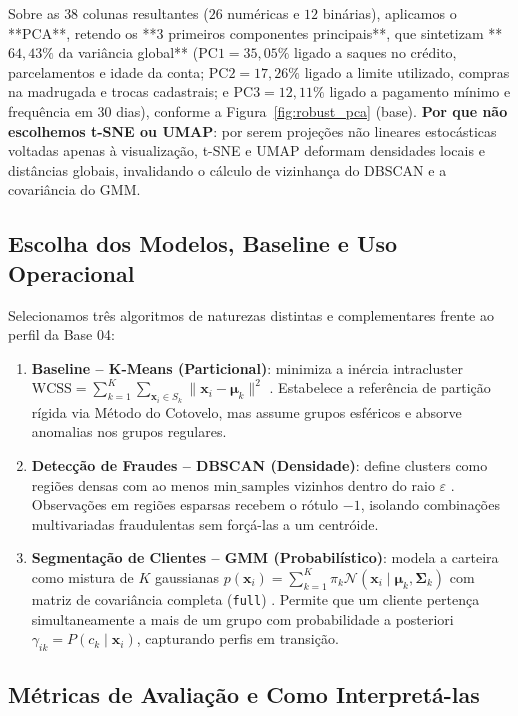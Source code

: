 \documentclass[10pt,twocolumn]{article}
\begin{document}
Sobre as $38$ colunas resultantes ($26$ numéricas e $12$ binárias), aplicamos o **PCA**, retendo os **$3$ primeiros componentes principais**, que sintetizam **$64,43\%$ da variância global** ($\text{PC1} = 35,05\%$ ligado a saques no crédito, parcelamentos e idade da conta; $\text{PC2} = 17,26\%$ ligado a limite utilizado, compras na madrugada e trocas cadastrais; e $\text{PC3} = 12,11\%$ ligado a pagamento mínimo e frequência em $30$ dias), conforme a Figura~\ref{fig:robust_pca} (base). \textbf{Por que não escolhemos t-SNE ou UMAP}: por serem projeções não lineares estocásticas voltadas apenas à visualização, t-SNE e UMAP deformam densidades locais e distâncias globais, invalidando o cálculo de vizinhança do DBSCAN e a covariância do GMM.

\subsection{Escolha dos Modelos, Baseline e Uso Operacional}

Selecionamos três algoritmos de naturezas distintas e complementares frente ao perfil da Base 04:
\begin{enumerate}
  \item \textbf{Baseline -- K-Means (Particional)}: minimiza a inércia intracluster $\text{WCSS} = \sum_{k=1}^{K}\sum_{\mathbf{x}_i \in S_k}\|\mathbf{x}_i - \boldsymbol{\mu}_k\|^2$ \cite{macqueen1967}. Estabelece a referência de partição rígida via Método do Cotovelo, mas assume grupos esféricos e absorve anomalias nos grupos regulares.
  \item \textbf{Detecção de Fraudes -- DBSCAN (Densidade)}: define clusters como regiões densas com ao menos $\text{min\_samples}$ vizinhos dentro do raio $\varepsilon$ \cite{ester1996}. Observações em regiões esparsas recebem o rótulo $-1$, isolando combinações multivariadas fraudulentas sem forçá-las a um centróide.
  \item \textbf{Segmentação de Clientes -- GMM (Probabilístico)}: modela a carteira como mistura de $K$ gaussianas $p(\mathbf{x}_i) = \sum_{k=1}^{K}\pi_k \mathcal{N}(\mathbf{x}_i \mid \boldsymbol{\mu}_k, \boldsymbol{\Sigma}_k)$ com matriz de covariância completa (\texttt{full}) \cite{dempster1977,reynolds2009}. Permite que um cliente pertença simultaneamente a mais de um grupo com probabilidade a posteriori $\gamma_{ik} = P(c_k \mid \mathbf{x}_i)$, capturando perfis em transição.
\end{enumerate}

\subsection{Métricas de Avaliação e Como Interpretá-las}
\end{document}
